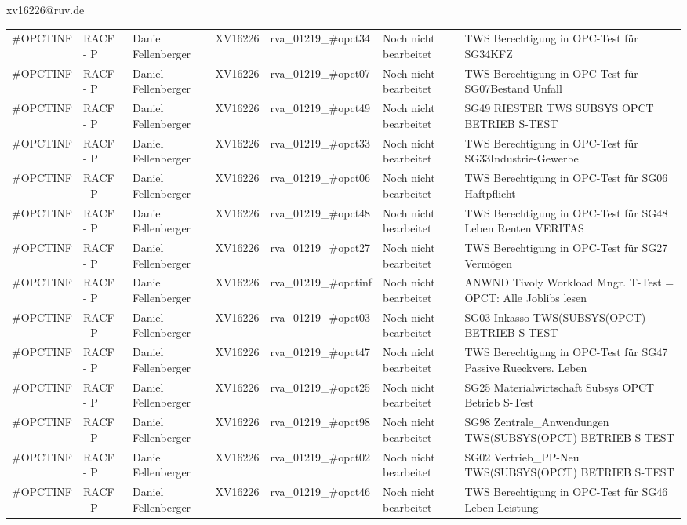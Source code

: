 \documentclass[a4paper,landscape,12pt]{letter}
\begin{document}
\begin{letter}{xv16226@ruv.de\hfill \break}
\begin{tiny}
\begin{longtable}{|p{35mm}|p{15mm}|p{25mm}|p{10mm}|p{40mm}|p{50mm}|p{50mm}|}
\#OPCTINF & RACF - P & Daniel Fellenberger & XV16226 & rva\_01219\_\#opct34 & Noch nicht bearbeitet & TWS Berechtigung in OPC-Test für SG34KFZ \\
\#OPCTINF & RACF - P & Daniel Fellenberger & XV16226 & rva\_01219\_\#opct07 & Noch nicht bearbeitet & TWS Berechtigung in OPC-Test für SG07Bestand Unfall \\
\#OPCTINF & RACF - P & Daniel Fellenberger & XV16226 & rva\_01219\_\#opct49 & Noch nicht bearbeitet & SG49 RIESTER TWS SUBSYS OPCT BETRIEB S-TEST \\
\#OPCTINF & RACF - P & Daniel Fellenberger & XV16226 & rva\_01219\_\#opct33 & Noch nicht bearbeitet & TWS Berechtigung in OPC-Test für SG33Industrie-Gewerbe \\
\#OPCTINF & RACF - P & Daniel Fellenberger & XV16226 & rva\_01219\_\#opct06 & Noch nicht bearbeitet & TWS Berechtigung in OPC-Test für SG06 Haftpflicht \\
\#OPCTINF & RACF - P & Daniel Fellenberger & XV16226 & rva\_01219\_\#opct48 & Noch nicht bearbeitet & TWS Berechtigung in OPC-Test für SG48 Leben Renten VERITAS \\
\#OPCTINF & RACF - P & Daniel Fellenberger & XV16226 & rva\_01219\_\#opct27 & Noch nicht bearbeitet & TWS Berechtigung in OPC-Test für SG27 Vermögen \\
\#OPCTINF & RACF - P & Daniel Fellenberger & XV16226 & rva\_01219\_\#opctinf & Noch nicht bearbeitet & ANWND Tivoly Workload Mngr. T-Test = OPCT: Alle Joblibs lesen \\
\#OPCTINF & RACF - P & Daniel Fellenberger & XV16226 & rva\_01219\_\#opct03 & Noch nicht bearbeitet & SG03 Inkasso TWS(SUBSYS(OPCT) BETRIEB S-TEST \\
\#OPCTINF & RACF - P & Daniel Fellenberger & XV16226 & rva\_01219\_\#opct47 & Noch nicht bearbeitet & TWS Berechtigung in OPC-Test für SG47 Passive Rueckvers. Leben \\
\#OPCTINF & RACF - P & Daniel Fellenberger & XV16226 & rva\_01219\_\#opct25 & Noch nicht bearbeitet & SG25 Materialwirtschaft Subsys OPCT Betrieb S-Test \\
\#OPCTINF & RACF - P & Daniel Fellenberger & XV16226 & rva\_01219\_\#opct98 & Noch nicht bearbeitet & SG98 Zentrale\_Anwendungen TWS(SUBSYS(OPCT) BETRIEB S-TEST \\
\#OPCTINF & RACF - P & Daniel Fellenberger & XV16226 & rva\_01219\_\#opct02 & Noch nicht bearbeitet & SG02 Vertrieb\_PP-Neu TWS(SUBSYS(OPCT) BETRIEB S-TEST \\
\#OPCTINF & RACF - P & Daniel Fellenberger & XV16226 & rva\_01219\_\#opct46 & Noch nicht bearbeitet & TWS Berechtigung in OPC-Test für SG46 Leben Leistung \\

\end{longtable}
\end{tiny}
\end{letter}
\end{document}
